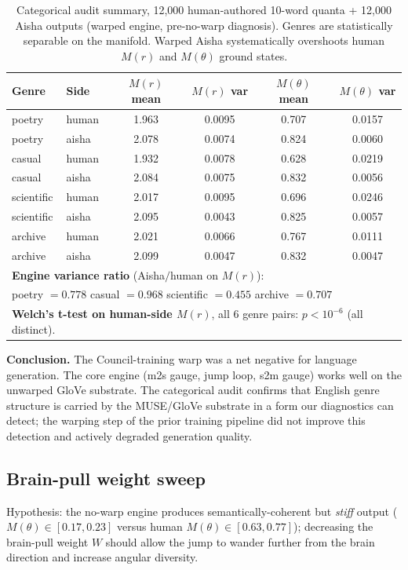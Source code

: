 \documentclass[11pt,a4paper]{article}
\begin{document}
\begin{table}[ht]
\centering
\footnotesize
\begin{tabular}{llcccc}
\toprule
\textbf{Genre} & \textbf{Side} & $M(r)$ \textbf{mean} & $M(r)$ \textbf{var} & $M(\theta)$ \textbf{mean} & $M(\theta)$ \textbf{var} \\
\midrule
poetry     & human & 1.963 & 0.0095 & 0.707 & 0.0157 \\
poetry     & aisha & 2.078 & 0.0074 & 0.824 & 0.0060 \\
casual     & human & 1.932 & 0.0078 & 0.628 & 0.0219 \\
casual     & aisha & 2.084 & 0.0075 & 0.832 & 0.0056 \\
scientific & human & 2.017 & 0.0095 & 0.696 & 0.0246 \\
scientific & aisha & 2.095 & 0.0043 & 0.825 & 0.0057 \\
archive    & human & 2.021 & 0.0066 & 0.767 & 0.0111 \\
archive    & aisha & 2.099 & 0.0047 & 0.832 & 0.0047 \\
\midrule
\multicolumn{6}{l}{\textbf{Engine variance ratio} (Aisha$/$human on $M(r)$):} \\
\multicolumn{6}{l}{\quad poetry $= 0.778$ \quad casual $= 0.968$ \quad scientific $= 0.455$ \quad archive $= 0.707$} \\
\midrule
\multicolumn{6}{l}{\textbf{Welch's t-test on human-side $M(r)$}, all 6 genre pairs: $p < 10^{-6}$ (all distinct).} \\
\bottomrule
\end{tabular}
\caption{Categorical audit summary, 12{,}000 human-authored 10-word quanta + 12{,}000 Aisha outputs (warped engine, pre-no-warp diagnosis). Genres are statistically separable on the manifold. Warped Aisha systematically overshoots human $M(r)$ and $M(\theta)$ ground states.}
\label{tab:categorical}
\end{table}

\textbf{Conclusion.} The Council-training warp was a net negative for language generation. The core engine (m2s gauge, jump loop, s2m gauge) works well on the unwarped GloVe substrate. The categorical audit confirms that English genre structure is carried by the MUSE/GloVe substrate in a form our diagnostics can detect; the warping step of the prior training pipeline did not improve this detection and actively degraded generation quality.

\subsection{Brain-pull weight sweep}
Hypothesis: the no-warp engine produces semantically-coherent but \emph{stiff} output ($M(\theta) \in [0.17, 0.23]$ versus human $M(\theta) \in [0.63, 0.77]$); decreasing the brain-pull weight $W$ should allow the jump to wander further from the brain direction and increase angular diversity.
\end{document}
